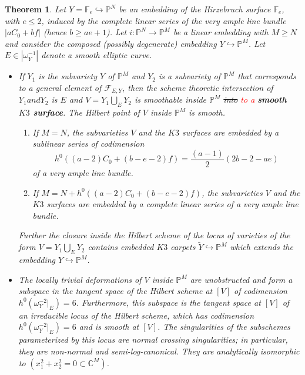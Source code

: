 \documentclass[11pt,twoside]{amsart}
\theoremstyle{plain}
\numberwithin{equation}{section}
\newtheorem{theorem}{Theorem}[section]
\theoremstyle{definition}
\begin{document}
\begin{theorem}\label{Hirzebruch main}
Let $Y = \mathbb{F}_e \hookrightarrow \mathbb{P}^N$ be an embedding of the Hirzebruch surface $\mathbb{F}_e$, with $e \leq 2$, induced by the complete linear series of the very ample line bundle $|aC_0+bf|$ (hence $b \geq ae+1$). Let $i: \mathbb{P}^N \to \mathbb{P}^M$ be a linear embedding with $M \geq N$ and consider the composed (possibly degenerate) embedding $Y \hookrightarrow \mathbb{P}^M$. Let $E \in |\omega_Y^{-1}|$ denote a smooth elliptic curve.
\begin{itemize}
    \item[(1)] If $Y_1$ is the subvariety $Y$ of $\mathbb P^M$ and $Y_2$ is a subvariety of $\mathbb P^M$ that corresponds to a general element of $\mathcal{F}_{E,Y}$, then {the scheme theoretic intersection of $Y_1 and Y_2$ is $E$ and} {$V = Y_1 \bigcup_E Y_2$} is  smoothable inside $\mathbb{P}^M$ \sout{into}  \textcolor{red}{to a} \textbf{smooth $K3$ surface}. The Hilbert point of $V$ inside $\mathbb{P}^M$ is smooth. 
    \begin{enumerate}
        \item[(a)] If $M = N$, the subvarieties $V$ and the $K3$ surfaces are embedded by a sublinear series of codimension $$h^0((a-2)C_0+(b-e-2)f) = \displaystyle\frac{(a-1)}{2}(2b-2-ae)$$ of a very ample line bundle.
        \item[(b)] If $M = N + h^0((a-2)C_0+(b-e-2)f)$, the subvarieties $V$ and the $K3$ surfaces are embedded by a complete linear series  of a very ample line bundle.
    \end{enumerate}
     Further the closure inside the Hilbert scheme of the locus of varieties of the form $V = Y_1 \bigcup_E Y_2$ contains embedded $K3$ carpets $\widetilde{Y} \hookrightarrow \mathbb{P}^M$ which extends the embedding $Y \hookrightarrow \mathbb{P}^M$.  
    
    \smallskip
    
    \item[(2)] The locally trivial deformations of $V$ inside $\mathbb{P}^M$ are unobstructed and form a subspace in the tangent space of the Hilbert scheme at $[V]$ of codimension $h^0(\omega_Y^{-2}|_E) = 6$. Furthermore, this subspace is the tangent space at $[V]$ of an irreducible locus of the Hilbert scheme, which has codimension $h^0(\omega_Y^{-2}|_E) = 6$ and is smooth at $[V]$. The singularities of the subschemes parameterized by this locus are normal crossing singularities;  in particular, they are non-normal and semi-log-canonical. They are analytically isomorphic to $(x_1^2+x_2^2 = 0 \subset \mathbb{C}^M)$. 
    \smallskip
    

\end{itemize}
\end{theorem}
\end{document}
